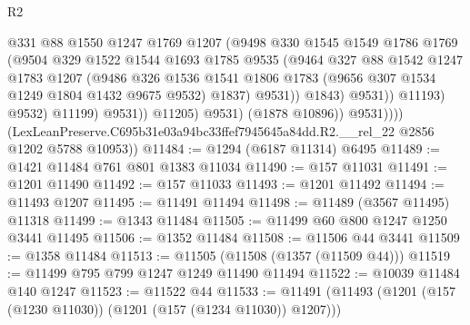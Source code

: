 \begin{lexlean}{R2}
\begin{coremodule}
                                  @331
                                  @88
                                  @1550
                                  @1247
                                  @1769
                                  @1207
                                  (@9498
                                    @330
                                    @1545
                                    @1549
                                    @1786
                                    @1769
                                    (@9504
                                      @329
                                      @1522
                                      @1544
                                      @1693
                                      @1785
                                      @9535
                                      (@9464
                                        @327
                                        @88
                                        @1542
                                        @1247
                                        @1783
                                        @1207
                                        (@9486
                                          @326
                                          @1536
                                          @1541
                                          @1806
                                          @1783
                                          (@9656 @307 @1534 @1249 @1804 @1432 @9675 @9532)
                                          @1837)
                                        @9531))
                                    @1843)
                                  @9531))
                              @11193)
                            @9532)
                          @11199)
                        @9531))
                    @11205)
                  @9531)
                (@1878 @10896))
              @9531))))
      (LexLeanPreserve.C695b31e03a94bc33ffef7945645a84dd.R2.__rel_22 @2856 @1202 @5788 @10953))
@11484 := @1294 (@6187 @11314) @6495
@11489 := @1421 @11484 @761 @801 @1383 @11034
@11490 := @157 @11031
@11491 := @1201 @11490
@11492 := @157 @11033
@11493 := @1201 @11492
@11494 := @11493 @1207
@11495 := @11491 @11494
@11498 := @11489 (@3567 @11495) @11318
@11499 := @1343 @11484
@11505 := @11499 @60 @800 @1247 @1250 @3441 @11495
@11506 := @1352 @11484
@11508 := @11506 @44 @3441
@11509 := @1358 @11484
@11513 := @11505 (@11508 (@1357 (@11509 @44)))
@11519 := @11499 @795 @799 @1247 @1249 @11490 @11494
@11522 := @10039 @11484 @140 @1247
@11523 := @11522 @44
@11533 := @11491 (@11493 (@1201 (@157 (@1230 @11030)) (@1201 (@157 (@1234 @11030)) @1207)))

\end{coremodule}
\end{lexlean}
